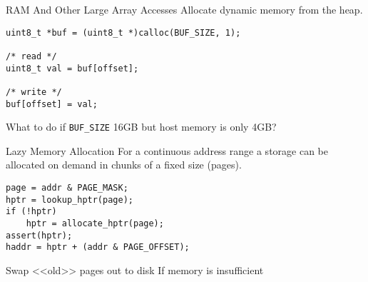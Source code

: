 \begin{frame}[fragile]{RAM And Other Large Array Accesses}
Allocate dynamic memory from the heap.
\vfill
\begin{lstlisting}
uint8_t *buf = (uint8_t *)calloc(BUF_SIZE, 1);

/* read */
uint8_t val = buf[offset];

/* write */
buf[offset] = val;
\end{lstlisting}
\vfill\pause
What to do if \texttt{BUF_SIZE} 16GB but host memory is only 4GB?
\end{frame}

\begin{frame}[fragile]{Lazy Memory Allocation}
For a continuous address range a storage can be allocated on demand in chunks
of a fixed size (pages).
\vfill
\begin{lstlisting}
page = addr & PAGE_MASK;
hptr = lookup_hptr(page);
if (!hptr)
    hptr = allocate_hptr(page);
assert(hptr);
haddr = hptr + (addr & PAGE_OFFSET);
\end{lstlisting}
\vfill
Swap <<old>> pages out to disk If memory is insufficient
\end{frame}

